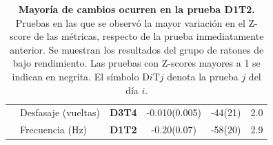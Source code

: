 \begin{table}[htbp]
\begin{tabular}{clcccc}
                                                                      & Desfasaje (vueltas)               & \bf D3T4                                                 & -0.010(0.005)    & -44(21)                  & 2.0              \\
                                                                      & Frecuencia (Hz)                   & \bf D1T2                                                 & -0.20(0.07)      & -58(20)                  & 2.9
    \end{tabular}
    \caption{\textbf{Mayoría de cambios ocurren en la prueba D1T2.} Pruebas en las que se observó la mayor variación en el Z-score de las métricas, respecto de la prueba inmediatamente anterior. Se muestran los resultados del grupo de ratones de bajo rendimiento. Las pruebas con Z-scores mayores a 1 se indican en negrita. El símbolo D$i$T$j$ denota la prueba $j$ del día $i$.}
    \label{tab:variacion-interpureba}
\end{table}

